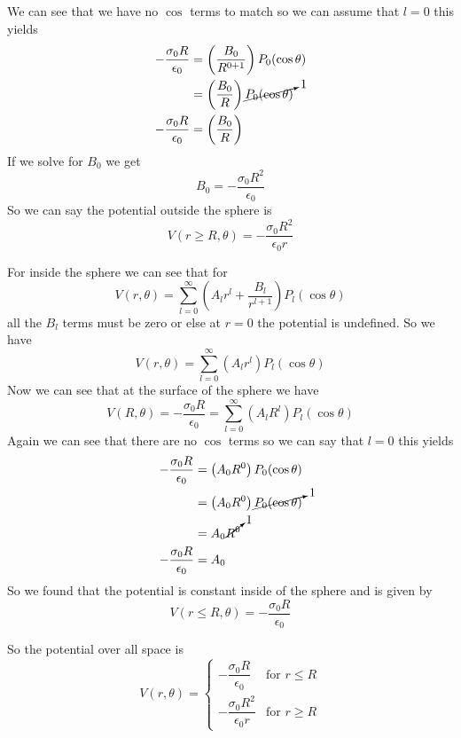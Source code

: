 \documentclass[11pt]{article}
\numberwithin{equation}{section}
\begin{document}
\begin{enumerate}[(i)]
We can see that we have no $\cos$ terms to match so we can assume that $l=0$ this yields
\begin{align*}
-\frac{\sigma_0 R}{\epsilon_0} &= \left(\frac{B_0}{R^{0+1}}\right)P_0(\cos\theta)\\
 &= \left(\frac{B_0}{R}\right)\cancelto{1}{P_0(\cos\theta)}\\
-\frac{\sigma_0 R}{\epsilon_0} &= \left(\frac{B_0}{R}\right)
\end{align*}
If we solve for $B_0$ we get
$$B_0 = -\frac{\sigma_0 R^2}{\epsilon_0}$$
So we can say the potential outside the sphere is
$$V(r\ge R,\theta) = -\frac{\sigma_0 R^2}{\epsilon_0 r}$$

For inside the sphere we can see that for
$$V(r,\theta) = \sum_{l=0}^{\infty}\left(A_lr^l+\frac{B_l}{r^{l+1}}\right)P_l(\cos\theta)$$
all the $B_l$ terms must be zero or else at $r=0$ the potential is undefined. So we have
$$V(r,\theta) = \sum_{l=0}^{\infty}\left(A_lr^l\right)P_l(\cos\theta)$$
Now we can see that at the surface of the sphere we have
$$V(R,\theta) = -\frac{\sigma_0 R}{\epsilon_0} = \sum_{l=0}^{\infty}\left(A_lR^l\right)P_l(\cos\theta)$$
Again we can see that there are no $\cos$ terms so we can say that $l=0$ this yields
\begin{align*}
-\frac{\sigma_0 R}{\epsilon_0} &= \left(A_0R^0\right)P_0(\cos\theta)\\
&= \left(A_0R^0\right)\cancelto{1}{P_0(\cos\theta)}\\
&= A_0\cancelto{1}{R^0}\\
-\frac{\sigma_0 R}{\epsilon_0} &= A_0\\
\end{align*}
So we found that the potential is constant inside of the sphere and is given by
$$V(r\le R,\theta) = -\frac{\sigma_0 R}{\epsilon_0}$$

So the potential over all space is
$$V(r,\theta) = \left\{\begin{array}{cc}
	-\dfrac{\sigma_0 R}{\epsilon_0} &\mbox{for } r\le R\\
	-\dfrac{\sigma_0 R^2}{\epsilon_0 r} &\mbox{for } r\ge R
	\end{array}\right.$$


\end{enumerate}
\end{document}
